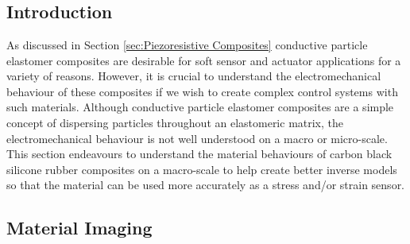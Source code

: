 \chapter{\chapiiiname}
\label{chapter3}

\section{Introduction}
As discussed in Section \ref{sec:Piezoresistive Composites} conductive particle elastomer composites are desirable for soft sensor and actuator applications for a variety of reasons. However, it is crucial to understand the electromechanical behaviour of these composites if we wish to create complex control systems with such materials. Although conductive particle elastomer composites are a simple concept of dispersing particles throughout an elastomeric matrix, the electromechanical behaviour is not well understood on a macro or micro-scale. This section endeavours to understand the material behaviours of carbon black silicone rubber composites on a macro-scale to help create better inverse models so that the material can be used more accurately as a stress and/or strain sensor. 



\section{Material Imaging}



